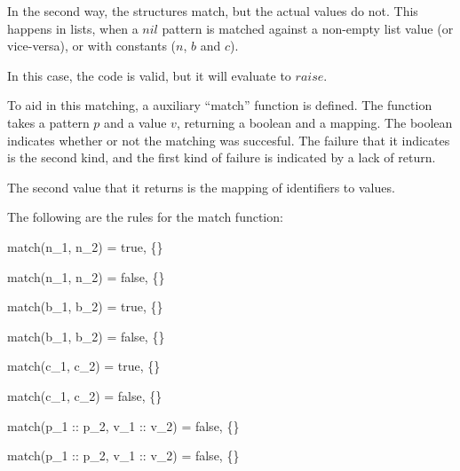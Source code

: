 \documentclass{article}
\begin{document}
In the second way, the structures match, but the actual values do not.
This happens in lists, when a $nil$ pattern is matched against a non-empty list value (or vice-versa), or with constants ($n$, $b$ and $c$).

In this case, the code is valid, but it will evaluate to $raise$.

\medskip

To aid in this matching, a auxiliary ``match'' function is defined.
The function takes a pattern $p$ and a value $v$, returning a boolean and a mapping.
The boolean indicates whether or not the matching was succesful.
The failure that it indicates is the second kind, and the first kind of failure is indicated by a lack of return.

The second value that it returns is the mapping of identifiers to values.

The following are the rules for the match function:



    {match(n_1, n_2) = true, \{\}}

    {match(n_1, n_2) = false, \{\}}

    {match(b_1, b_2) = true, \{\}}

    {match(b_1, b_2) = false, \{\}}

    {match(c_1, c_2) = true, \{\}}

    {match(c_1, c_2) = false, \{\}}

\smallskip



\smallskip


    {match(p_1 :: p_2, v_1 :: v_2) = false, \{\}}

    {match(p_1 :: p_2, v_1 :: v_2) = false, \{\}}
\end{document}
